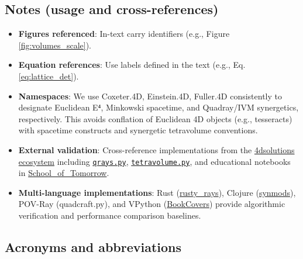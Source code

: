 \documentclass[
  10pt,
]{article}
\providecommand{\tightlist}{%
  \setlength{\itemsep}{0pt}\setlength{\parskip}{0pt}}
\begin{document}
\hypertarget{notes-usage-and-cross-references}{%
\subsection{Notes (usage and
cross-references)}\label{notes-usage-and-cross-references}}

\begin{itemize}
\tightlist
\item
  \textbf{Figures referenced}: In-text carry identifiers (e.g., Figure
  \ref{fig:volumes_scale}).
\item
  \textbf{Equation references}: Use labels defined in the text (e.g.,
  Eq. \eqref{eq:lattice_det}).
\item
  \textbf{Namespaces}: We use Coxeter.4D, Einstein.4D, Fuller.4D
  consistently to designate Euclidean E⁴, Minkowski spacetime, and
  Quadray/IVM synergetics, respectively. This avoids conflation of
  Euclidean 4D objects (e.g., tesseracts) with spacetime constructs and
  synergetic tetravolume conventions.
\item
  \textbf{External validation}: Cross-reference implementations from the
  \href{https://github.com/4dsolutions}{4dsolutions ecosystem} including
  \href{https://github.com/4dsolutions/m4w/blob/main/qrays.py}{\texttt{qrays.py}},
  \href{https://github.com/4dsolutions/m4w/blob/main/tetravolume.py}{\texttt{tetravolume.py}},
  and educational notebooks in
  \href{https://github.com/4dsolutions/School_of_Tomorrow}{School\_of\_Tomorrow}.
\item
  \textbf{Multi-language implementations}: Rust
  (\href{https://github.com/4dsolutions/rusty_rays}{rusty\_rays}),
  Clojure (\href{https://github.com/4dsolutions/synmods}{synmods}),
  POV-Ray (quadcraft.py), and VPython
  (\href{https://github.com/4dsolutions/BookCovers}{BookCovers}) provide
  algorithmic verification and performance comparison baselines.
\end{itemize}

\hypertarget{acronyms-and-abbreviations}{%
\subsection{Acronyms and
abbreviations}\label{acronyms-and-abbreviations}}
\end{document}
